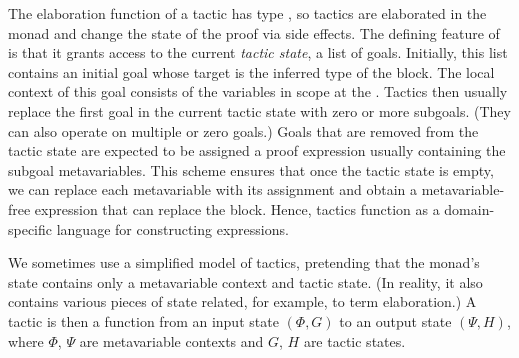 The elaboration function of a tactic has type , so tactics are elaborated in the  monad and change the state of the proof via side effects.
The defining feature of  is that it grants access to the current \emph{tactic state}, a list of goals.
Initially, this list contains an initial goal whose target is the inferred type of the  block.
The local context of this goal consists of the variables in scope at the .
Tactics then usually replace the first goal in the current tactic state with zero or more subgoals.
(They can also operate on multiple or zero goals.)
Goals that are removed from the tactic state are expected to be assigned a proof expression usually containing the subgoal metavariables.
This scheme ensures that once the tactic state is empty, we can replace each metavariable with its assignment and obtain a metavariable-free expression that can replace the  block.
Hence, tactics function as a domain-specific language for constructing expressions.

We sometimes use a simplified model of tactics, pretending that the  monad's state contains only a metavariable context and tactic state.
(In reality, it also contains various pieces of state related, for example, to term elaboration.)
A tactic is then a function from an input state $(Φ, G)$ to an output state $(Ψ, H)$, where $Φ$, $Ψ$ are metavariable contexts and $G$, $H$ are tactic states.
